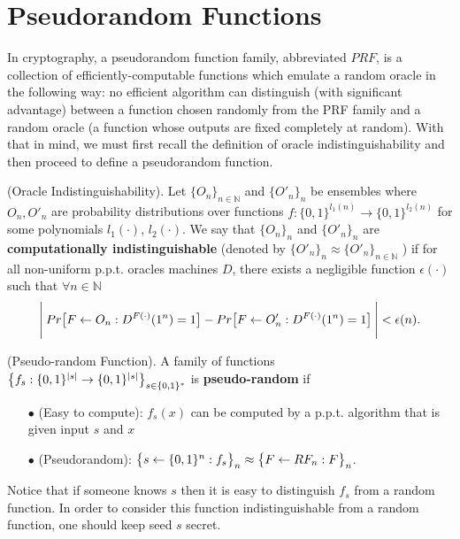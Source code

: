 \section{Pseudorandom Functions} \label{sec:PRF}
In cryptography, a pseudorandom function family, abbreviated $PRF$, is a collection of efficiently-computable functions which emulate a random oracle in the following way: no efficient algorithm can distinguish (with significant advantage) between a function chosen randomly from the PRF family and a random oracle (a function whose outputs are fixed completely at random). With that in mind,
we must first recall the definition of oracle indistinguishability and then proceed to define a pseudorandom function.

\begin{definition}{(Oracle Indistinguishability).} \textnormal{\cite{ACI}}
  Let $\{ O_n \}_{n \in \mathbb{N}}$ and $\{ O'_{n} \}_{n}$ be ensembles where $O_n, O'_n$ are probability
  distributions over functions $f: \{ 0,1 \}^{l_1(n)} \rightarrow \{ 0,1 \}^{l_2(n)}$ for some polynomials $l_1(\cdot)$, $l_2(\cdot)$. We say that $\{ O_{n} \}_{n}$ and $\{ O'_{n} \}_{n}$ are \textbf{computationally indistinguishable} (denoted by $\{ O'_{n} \}_{n} \approx \{ O'_n \}_{n \in \mathbb{N}}$
  ) if for all non-uniform p.p.t. oracles machines $D$, there exists a negligible function $\epsilon(\cdot)$ such that $\forall n \in \mathbb{N}$
  \begin{equation}{\label{oracle}}
    \Bigg{\lvert} \: Pr \big{[} F \leftarrow O_n : D^{F(\cdot)}(1^n)=1 \big{]} - Pr \big{[} F \leftarrow O'_n : D^{F(\cdot)}(1^n)=1 \big{]} \: \Bigg{\rvert} < \epsilon(n).
  \end{equation}
\end{definition}

\begin{definition}{(Pseudo-random Function).} \textnormal{\cite{ACI}}
  A family of functions $\big{\{} f_s: \{ 0,1 \}^{\lvert s \rvert} \rightarrow \{ 0,1 \}^{\lvert s \rvert} \big{\}}_{s \in \{ 0,1 \}^{*}}$ is \textbf{pseudo-random} if
  \begin{itemize}
    \item[$\bullet$] (Easy to compute): $f_s(x)$ can be computed by a p.p.t. algorithm that is given input $s$ and $x$
    \item[$\bullet$] (Pseudorandom): $\big{\{} s \leftarrow \{ 0,1 \}^n: f_s \big{\}}_n \approx \big{\{} F \leftarrow RF_n: F \big{\}}_n$.
  \end{itemize}
\end{definition}
Notice that if someone knows $s$ then it is easy to distinguish $f_s$ from a random function. In order to consider this function indistinguishable from a random function, one should keep seed $s$ secret.
%

